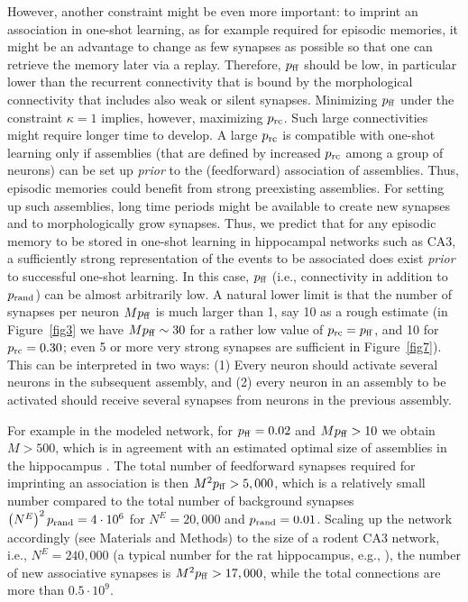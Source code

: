    However, another constraint might be even more important: to imprint an
    association in one-shot learning, as for example required for episodic
    memories, it might be an advantage to change as few synapses as possible so
    that one can retrieve the memory later via a replay. Therefore, $p_{\rm
    ff}$ should be low, in particular lower than the recurrent connectivity
    that is bound by the morphological connectivity that includes also weak or
    silent synapses. Minimizing $p_{\rm ff}$ under the constraint $\kappa =1$
    implies, however, maximizing $p_{\rm rc}$. Such large connectivities might
    require longer time to develop. A large $p_{\rm rc}$ is compatible with
    one-shot learning only if assemblies (that are defined by increased $p_{\rm
    rc}$ among a group of neurons) can be set up {\em prior} to the
    (feedforward) association of assemblies. Thus, episodic memories could
    benefit from strong preexisting assemblies. For setting up such assemblies,
    long time periods might be available to create new synapses and to
    morphologically grow synapses. Thus, we predict that for any episodic
    memory to be stored in one-shot learning in hippocampal networks such as
    CA3, a sufficiently strong representation of the events to be associated
    does exist {\em prior} to successful one-shot learning. In this case,
    $p_{\rm ff}$ (i.e., connectivity in addition to $p_{\rm rand}$) can be
    almost arbitrarily low. A natural lower limit is that the number of
    synapses per neuron $M p_{\rm ff}$ is much larger than 1, say 10 as a rough
    estimate (in Figure~\ref{fig3} we have $M p_{\rm ff} \sim 30$ for a
    rather low value of $p_{\rm rc}=p_{\rm ff}$, and 10 for $p_{\rm rc}=0.30$;
    even 5 or more very strong synapses are sufficient in
    Figure~\ref{fig7}). This can be interpreted in two ways: (1) Every
    neuron should activate several neurons in the subsequent
    assembly, and (2) every neuron in an assembly to be activated should
    receive several synapses from neurons in the previous assembly.

    For example in the modeled network, for $p_{\rm ff} = 0.02$ and $M p_{\rm
    ff} > 10$ we obtain $M > 500$, which is in agreement with an estimated
    optimal size of assemblies in the hippocampus \citep{Leibold2006}. The total
    number of feedforward synapses required for imprinting an association is
    then $M^2 p_{\rm ff} > 5,000$, which is a relatively small number compared
    to the total number of background synapses $\left( N^E \right)^2 p_{\rm
    rand}= 4 \cdot 10^6$ for $N^E=20,000$ and $p_{\rm rand}=0.01$. Scaling up
    the network accordingly (see Materials and Methods) to the size of a rodent
    CA3 network, i.e., $N^E = 240,000$ (a typical number for the rat
    hippocampus, e.g., \citealp{West1991, Rapp1996}), the number of new associative
    synapses is $M^2 p_{\rm ff} > 17,000$, while the total connections are more
    than $0.5 \cdot 10^9$.

